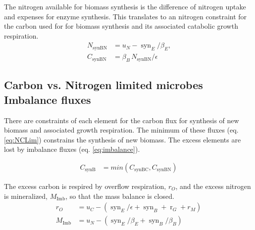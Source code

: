 The nitrogen available for biomass synthesis is the difference of nitrogen
uptake and expenses for enzyme synthesis. This translates to an nitrogen
constraint for the carbon used for for biomass synthesis and its associated
catabolic growth respiration.
\begin{subequations}
\label{eq:synBN}
\begin{align}
N_{\operatorname{synBN}} &= u_N - \operatorname{syn}_E/\beta_E \text{,} \\
C_{\operatorname{synBN}} &= \beta_B \, N_{\operatorname{synBN}}  / \epsilon
\end{align}
\end{subequations}


\subsection{Carbon vs. Nitrogen limited microbes Imbalance fluxes}
There are constraints of each element for the carbon flux for synthesis of new
biomass and associated growth respiration. The minimum of these fluxes (eq.
\ref{eq:NCLim}) constrains the synthesis of new biomass. The excess elements are
lost by imbalance fluxes (eq. \ref{eq:imbalance}).

\begin{subequations}
\label{eq:synB}
\begin{align}
\label{eq:NCLim} C_{\operatorname{synB}} &=
min(C_{\operatorname{synBC}}, C_{\operatorname{synBN}} )
\end{align}
\end{subequations}

The excess carbon is respired by overflow respiration, $r_O$, and the excess
nitrogen is mineralized, $M_{\operatorname{Imb}}$, so that the mass
balance is closed.
\begin{subequations}
\label{eq:imbalance}
\begin{align}
r_O &= u_C - (\operatorname{syn}_E /\epsilon  + \operatorname{syn}_B
+ \operatorname{r}_G + r_M )\\
M_{\operatorname{Imb}} &= u_N - (\operatorname{syn}_E/\beta_E +
\operatorname{syn}_{B}/\beta_B)
\end{align}
\end{subequations}

